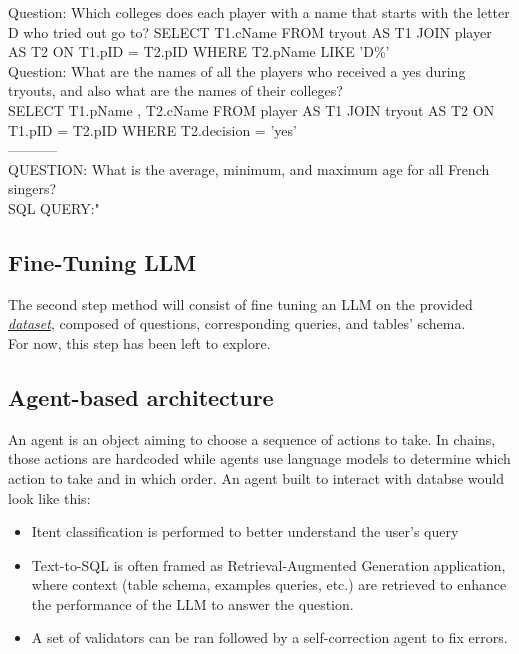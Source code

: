 \documentclass[12pt,a4paper]{article}
\begin{document}
Question: Which colleges does each player with a name that starts with the letter D  who tried out go to?
 SELECT T1.cName FROM  tryout AS T1 JOIN player AS T2 ON T1.pID  =  T2.pID WHERE T2.pName LIKE 'D\%'\\
Question: What are the names of all the players who received a yes during tryouts, and also what are the names of their colleges?\\
 SELECT T1.pName ,  T2.cName FROM player AS T1 JOIN tryout AS T2 ON T1.pID  =  T2.pID WHERE T2.decision  =  'yes'\\
-----------\\
QUESTION: What is the average, minimum, and maximum age for all French singers?\\
SQL QUERY:"\\
\subsection*{Fine-Tuning LLM}
The second step method will consist of fine tuning an LLM on the provided \textit{\href{https://huggingface.co/datasets/richardr1126/spider-schema/viewer?row=1}{dataset}}, composed of questions, corresponding queries, and tables' schema.
\\
For now, this step has been left to explore.

\subsection*{Agent-based architecture}

An agent is an object aiming to choose a sequence of actions to take. In chains, those actions are hardcoded while agents use language models to determine which action to take and in which order. An agent built to interact with databse would look like this:

\begin{itemize}
    \item Itent classification is performed to better understand the user's query
    \item Text-to-SQL is often framed as Retrieval-Augmented Generation application, where context (table schema, examples queries, etc.) are retrieved to enhance the performance of the LLM to answer the question. 
    \item A set of validators can be ran followed by a self-correction agent to fix errors.
\end{itemize}
\end{document}

